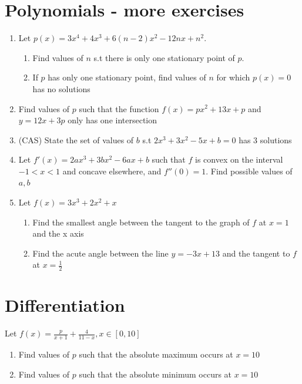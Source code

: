 \documentclass[12pt]{article}
\begin{document}
\section{Polynomials - more exercises}

\begin{enumerate}
    \item Let $p(x) = 3x^{4} + 4x^{3} + 6(n-2)x^{2} - 12n x + n^{2}$. 
    \begin{enumerate}
        \item Find values of $n$ s.t there is only one stationary point of $p$.
        \item If $p$ has only one stationary point, find values of $n$ for which $p(x) = 0$ has no solutions
    \end{enumerate}
    \item Find values of $p$ such that the function $f(x) = px^2+13x+p$ and $y = 12 x + 3p$ only has one intersection
    \item (CAS) State the set of values of $b$ s.t $2x^{3} + 3x^{2} - 5x + b = 0$ has 3 solutions
    \item Let $f'(x) = 2ax ^{3} + 3b x^{2} - 6 ax + b$ such that $f$ is convex on the interval $-1 < x< 1$ and concave elsewhere, and $f''(0) = 1$. Find possible values of $a,b$
    \item Let $f(x) = 3x^{3} + 2x^{2} + x$
    \begin{enumerate}
        \item Find the smallest angle between the tangent to the graph of $f$ at $x = 1$ and the x axis
        \item Find the acute angle between the line $y = -3x + 13$ and the tangent to $f$ at $x = \frac{1}{2}$
    \end{enumerate}
\end{enumerate}


\section{Differentiation}
Let $f(x) = \frac{p}{x+1}+\frac{4}{11-x}, x \in [0,10]$

\begin{enumerate}
    \item Find values of $p$ such that the absolute maximum occurs at $x = 10$
    \item Find values of $p$ such that the absolute minimum occurs at $x = 10$
\end{enumerate}
\end{document}
